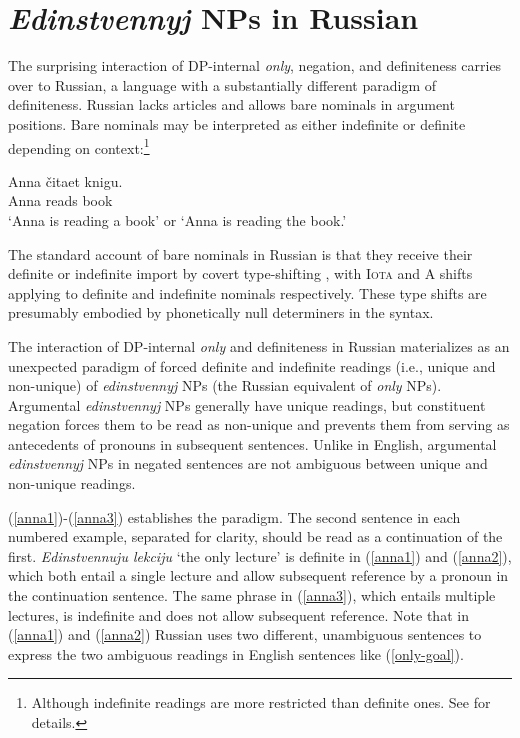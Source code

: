 \section{\textit{Edinstvennyj} NPs in Russian \label{sec:only-nps-russian}}
The surprising interaction of DP-internal \textit{only}, negation, and definiteness carries over to Russian, a language with a substantially different paradigm of definiteness. Russian lacks articles and allows bare nominals in argument positions. Bare nominals may be interpreted as either indefinite or definite depending on context:\footnote{Although indefinite readings are more restricted than definite ones. See \cite{geist2010} for details.}

\begin{exe}
	\ex \label{kniga} \gll Anna \v{c}itaet knigu.\\
	Anna reads book\\
	\glt `Anna is reading a book' or `Anna is reading the book.'
\end{exe}

The standard account of bare nominals in Russian is that they receive their definite or indefinite import by covert type-shifting \citep{chierchia98}, with  \textsc{Iota} and \textsc{A} shifts applying to definite and indefinite nominals respectively. These type shifts are presumably embodied by phonetically null determiners in the syntax.

The interaction of DP-internal \textit{only} and definiteness in Russian materializes as an unexpected paradigm of forced definite and indefinite readings (i.e., unique and non-unique) of \textit{edinstvennyj} NPs (the Russian equivalent of \textit{only} NPs). Argumental \textit{edinstvennyj} NPs generally have unique readings, but constituent negation forces them to be read as non-unique and prevents them from serving as antecedents of pronouns in subsequent sentences. Unlike in English, argumental \textit{edinstvennyj} NPs in negated sentences are not ambiguous between unique and non-unique readings.

(\ref{anna1})-(\ref{anna3}) establishes the paradigm. The second sentence in each numbered example, separated for clarity, should be read as a continuation of the first. \textit{Edinstvennuju lekciju} `the only lecture' is definite in (\ref{anna1}) and (\ref{anna2}), which both entail a single lecture and allow subsequent reference by a pronoun in the continuation sentence. The same phrase in (\ref{anna3}), which entails multiple lectures, is indefinite and does not allow subsequent reference. Note that in (\ref{anna1}) and (\ref{anna2}) Russian uses two different, unambiguous sentences to express the two ambiguous readings in English sentences like (\ref{only-goal}).

